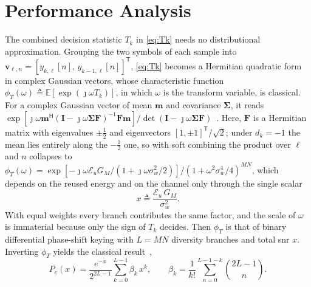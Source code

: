 \documentclass[12pt, draftclsnofoot, onecolumn]{IEEEtran}
\newcommand{\Eu}{\mathcal{E}_u}
\newenvironment{revblock}{}{}
\begin{document}
\section{Performance Analysis}
\label{sec:bep}

\begin{revblock}

The combined decision statistic $T_k$ in \eqref{eq:Tk} needs no distributional
approximation. Grouping the two
symbols of each sample into $\mathbf{v}_{\ell,n}=[y_{k,\ell}[n],\,
y_{k-1,\ell}[n]]^{\mathsf{T}}$, \eqref{eq:Tk} becomes a Hermitian quadratic form
in complex Gaussian vectors, whose characteristic function
$\phi_T(\omega)\triangleq\mathbb{E}[\exp(\jmath\omega T_k)]$, in which $\omega$
is the transform variable, is
classical. For a complex Gaussian vector of mean $\mathbf{m}$ and covariance
$\bm{\Sigma}$, it reads $\exp[\jmath\omega\mathbf{m}^{\mathsf{H}}(\mathbf{I}-
\jmath\omega\bm{\Sigma}\mathbf{F})^{-1}\mathbf{F}\mathbf{m}]/\det(\mathbf{I}-
\jmath\omega\bm{\Sigma}\mathbf{F})$~\cite{Turin_1960}. Here, $\mathbf{F}$ is a Hermitian matrix with eigenvalues $\pm\frac{1}{2}$ and eigenvectors $[1,\pm1]^{\mathsf{T}}/\sqrt{2}$;
under $d_k=-1$ the mean lies entirely along the $-\frac{1}{2}$ one, so with
soft combining the product over $\ell$ and $n$ collapses to
$\phi_T(\omega)=\exp[-\jmath\omega\Eu G_M/(1+\jmath\omega\sigma_w^2/2)]/
(1+\omega^2\sigma_w^4/4)^{MN}$, which depends on the reused energy and on the
channel only through the single scalar
\begin{equation}
x \triangleq \frac{\Eu\,G_M}{\sigma_w^{2}} .
\label{eq:x}
\end{equation}
With equal weights every branch contributes the same factor, and the scale of
$\omega$ is immaterial because only the sign of $T_k$ decides. Then $\phi_T$ is
that of binary differential phase-shift keying with $L=MN$ diversity branches
and total \ac{snr} $x$. Inverting $\phi_T$ yields the classical
result~\cite[Sec.~13.4]{Proakis_2008},
\begin{equation}
P_e(x)=\frac{e^{-x}}{2^{2L-1}}\sum_{k=0}^{L-1} \beta_k\,x^{k},
\qquad
\beta_k=\frac{1}{k!}\sum_{n=0}^{L-1-k}\binom{2L-1}{n} .
\label{eq:cond_exact}
\end{equation}


\end{revblock}
\end{document}

